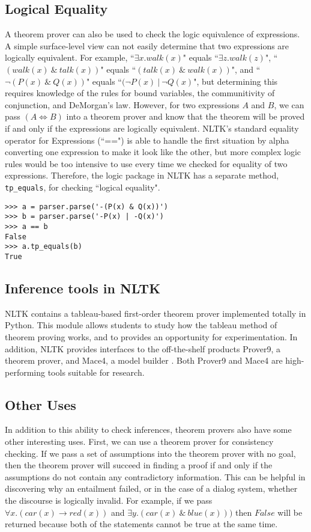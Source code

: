 \documentclass{article}
\newcommand{\dhgcode}[1]{{\tt #1}}
\begin{document}
\subsection{Logical Equality}
A theorem prover can also be used to check the logic equivalence of expressions.  A simple surface-level view can not easily determine that two expressions are logically equivalent.  For example, ``$\exists x.walk(x)$" equals ``$\exists z.walk(z)$", ``$(walk(x)~\&~talk(x))$" equals ``$(talk(x)~\&~walk(x))$", and ``$\neg(P(x)~\&~Q(x))$" equals ``$(\neg P(x)~|~\neg Q(x)$", but determining this requires knowledge of the rules for bound variables, the communitivity of conjunction, and DeMorgan's law.  However, for two expressions $A$ and $B$, we can pass $(A\iff B)$ into a theorem prover and know that the theorem will be proved if and only if the expressions are logically equivalent.  NLTK's standard equality operator for Expressions (``==") is able to handle the first situation by alpha converting one expression to make it look like the other, but more complex logic rules would be too intensive to use every time we checked for equality of two expressions.  Therefore, the logic package in NLTK has a separate method, \dhgcode{tp\_equals}, for checking ``logical equality".

\begin{verbatim}
>>> a = parser.parse('-(P(x) & Q(x))')
>>> b = parser.parse('-P(x) | -Q(x)')
>>> a == b
False
>>> a.tp_equals(b)
True
\end{verbatim}

\subsection{Inference tools in NLTK}
NLTK contains a tableau-based first-order theorem prover implemented totally in Python.  This module allows students to study how the tableau method of theorem proving works, and to provides an opportunity for experimentation.  In addition, NLTK provides interfaces to the off-the-shelf products Prover9, a theorem prover, and Mace4, a model builder \cite{McCune}.  Both Prover9 and Mace4 are high-performing tools suitable for research.

\subsection{Other Uses}
In addition to this ability to check inferences, theorem provers also have some other interesting uses.  First, we can use a theorem prover for consistency checking.  If we pass a set of assumptions into the theorem prover with no goal, then the theorem prover will succeed in finding a proof if and only if the assumptions do not contain any contradictory information.  This can be helpful in discovering why an entailment failed, or in the case of a dialog system, whether the discourse is logically invalid.  For example, if we pass $\forall x.(car(x) \rightarrow red(x))$ and $\exists y.(car(x)~\&~blue(x)))$ then $False$ will be returned because both of the  statements cannot be true at the same time.  
\end{document}
